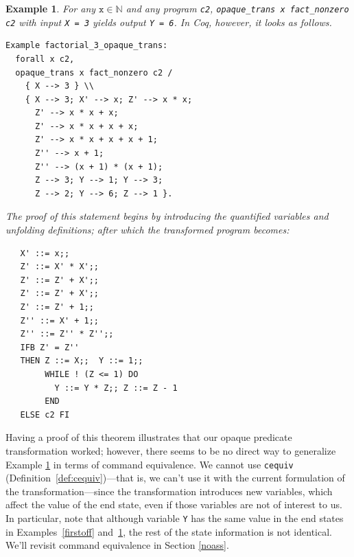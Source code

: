 \documentclass[compsoc,conference,a4paper,10pt,times]{IEEEtran}
\newtheorem{example}[theorem]{Example}
\begin{document}
\begin{example}\label{firstfact}
    For any $\mathtt{x}\in \mathbb{N}$ and any program \texttt{c2}, \texttt{opaque\_trans x fact\_nonzero c2} with input \texttt{X = 3} yields output \texttt{Y = 6}.  In Coq, however, it looks as follows.
\begin{verbatim}
Example factorial_3_opaque_trans:
  forall x c2, 
  opaque_trans x fact_nonzero c2 /
    { X --> 3 } \\
    { X --> 3; X' --> x; Z' --> x * x; 
      Z' --> x * x + x; 
      Z' --> x * x + x + x;
      Z' --> x * x + x + x + 1; 
      Z'' --> x + 1; 
      Z'' --> (x + 1) * (x + 1); 
      Z --> 3; Y --> 1; Y --> 3; 
      Z --> 2; Y --> 6; Z --> 1 }.
\end{verbatim}

The proof of this statement begins by introducing the quantified variables and unfolding definitions; after which the transformed program becomes: 
\begin{verbatim}
   X' ::= x;;
   Z' ::= X' * X';;
   Z' ::= Z' + X';;
   Z' ::= Z' + X';;
   Z' ::= Z' + 1;;
   Z'' ::= X' + 1;;
   Z'' ::= Z'' * Z'';;
   IFB Z' = Z'' 
   THEN Z ::= X;;  Y ::= 1;;
        WHILE ! (Z <= 1) DO
          Y ::= Y * Z;; Z ::= Z - 1 
        END
   ELSE c2 FI
\end{verbatim}
\end{example}

Having a proof of this theorem illustrates that our opaque predicate transformation worked; however, there seems to be no direct way to generalize Example \ref{firstfact} in terms of command equivalence. We cannot use \texttt{cequiv} (Definition~\ref{def:cequiv})---that is, we can't use it with the current formulation of the transformation---since the transformation introduces new variables, which affect the value of the end state, even if those variables are not of interest to us. In particular, note that although variable \texttt{Y} has the same value in the end states in Examples~\ref{firstoff} and~\ref{firstfact}, the rest of the state information is not identical. We'll revisit command equivalence in Section \ref{noass}.
      
\end{document}
